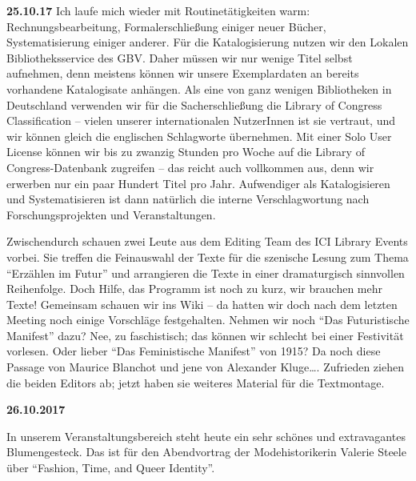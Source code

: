 \documentclass[a4paper,
fontsize=11pt,
oneside,
numbers=noperiodatend,
parskip=half-,
bibliography=totoc,
final
]{scrartcl}
\begin{document}
\textbf{25.10.17} Ich laufe mich wieder mit Routinetätigkeiten warm:
Rechnungsbearbeitung, Formalerschließung einiger neuer Bücher,
Systematisierung einiger anderer. Für die Katalogisierung nutzen wir den
Lokalen Bibliotheksservice des GBV. Daher müssen wir nur wenige Titel
selbst aufnehmen, denn meistens können wir unsere Exemplardaten an
bereits vorhandene Katalogisate anhängen. Als eine von ganz wenigen
Bibliotheken in Deutschland verwenden wir für die Sacherschließung die
Library of Congress Classification -- vielen unserer internationalen
NutzerInnen ist sie vertraut, und wir können gleich die englischen
Schlagworte übernehmen. Mit einer Solo User License können wir bis zu
zwanzig Stunden pro Woche auf die Library of Congress-Datenbank
zugreifen -- das reicht auch vollkommen aus, denn wir erwerben nur ein
paar Hundert Titel pro Jahr. Aufwendiger als Katalogisieren und
Systematisieren ist dann natürlich die interne Verschlagwortung nach
Forschungsprojekten und Veranstaltungen.

Zwischendurch schauen zwei Leute aus dem Editing Team des ICI Library
Events vorbei. Sie treffen die Feinauswahl der Texte für die szenische
Lesung zum Thema \enquote{Erzählen im Futur} und arrangieren die Texte
in einer dramaturgisch sinnvollen Reihenfolge. Doch Hilfe, das Programm
ist noch zu kurz, wir brauchen mehr Texte! Gemeinsam schauen wir ins
Wiki -- da hatten wir doch nach dem letzten Meeting noch einige
Vorschläge festgehalten. Nehmen wir noch \enquote{Das Futuristische
Manifest} dazu? Nee, zu faschistisch; das können wir schlecht bei einer
Festivität vorlesen. Oder lieber \enquote{Das Feministische Manifest}
von 1915? Da noch diese Passage von Maurice Blanchot und jene von
Alexander Kluge\ldots{}. Zufrieden ziehen die beiden Editors ab; jetzt
haben sie weiteres Material für die Textmontage.

\textbf{26.10.2017}

In unserem Veranstaltungsbereich steht heute ein sehr schönes und
extravagantes Blumengesteck. Das ist für den Abendvortrag der
Modehistorikerin Valerie Steele über \enquote{Fashion, Time, and Queer
Identity}.
\end{document}
